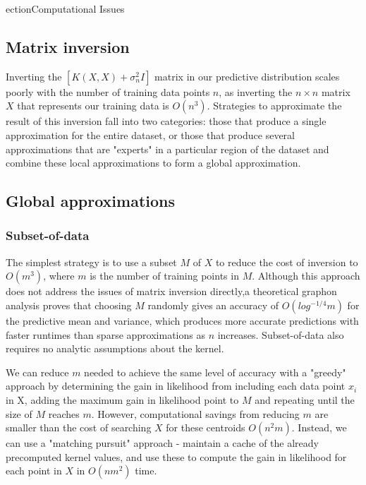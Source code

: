 ection{Computational Issues}


\subsection{Matrix inversion \cite{big-data}}
Inverting the $[K(X,X) + \sigma^2_nI]$ matrix in our predictive distribution scales poorly with the number of training data points $n$, as inverting the $n \times n$ matrix $X$ that represents our training data is $O(n^3)$. Strategies to approximate the result of this inversion fall into two categories: those that produce a single approximation for the entire dataset, or those that produce several approximations that are "experts" in a particular region of the dataset and combine these local approximations to form a global approximation.

\subsection{Global approximations}

\subsubsection{Subset-of-data}
The simplest strategy is to use a subset $M$ of $X$ to reduce the cost of inversion to $O(m^3)$, where $m$ is the number of training points in $M$. Although this approach does not address the issues of matrix inversion directly,a theoretical graphon analysis proves that choosing $M$ randomly gives an accuracy of $O(log^{-1/4}m)$ for the predictive mean and variance, which produces more accurate predictions with faster runtimes than sparse approximations as $n$ increases. \cite{random-subsampling} Subset-of-data also requires no analytic assumptions about the kernel.


We can reduce $m$ needed to achieve the same level of accuracy with a "greedy" approach by determining the gain in likelihood from including each data point $x_i$ in X, adding the maximum gain in likelihood point to $M$ and repeating until the size of $M$ reaches $m$. However, computational savings from reducing $m$ are smaller than the cost of searching $X$ for these centroids $O(n^2m)$. Instead, we can use a "matching pursuit" approach - maintain a cache of the already precomputed kernel values, and use these to compute the gain in likelihood for each point in $X$ in $O(nm^2)$ time. \cite{matching-pursuit}

